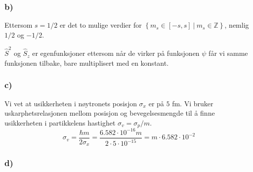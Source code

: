 \documentclass{article}
\begin{document}
\subsubsection*{b)}
Ettersom $s= 1 / 2$ er det to mulige verdier for $\left\{m_s ∈ [-s, s]\ |\ m_s ∈ ℤ\right\}$, nemlig  $1 / 2$ og $- 1 / 2$. 

$\hat{S}^2$ og $\hat{S}_z$ er egenfunksjoner ettersom når de virker på funksjonen $ψ$ får vi samme funksjonen tilbake, bare multiplisert med en konstant.

\subsubsection*{c)}
Vi vet at usikkerheten i nøytronets posisjon $σ_x$ er på $5$ fm. Vi bruker uskarphetsrelasjonen mellom posisjon og bevegelsesmengde til å finne usikkerheten i partikkelens hastighet $σ_v = σ_p / m$.
\[
σ_v = \frac{ℏm}{2σ_x} = \frac{6.582 ⋅ 10^{-16} m}{2 ⋅ 5 ⋅ 10^{-15}} = m ⋅ 6.582 ⋅ 10^{-2} 
\] 

\subsubsection*{d)}
\end{document}
